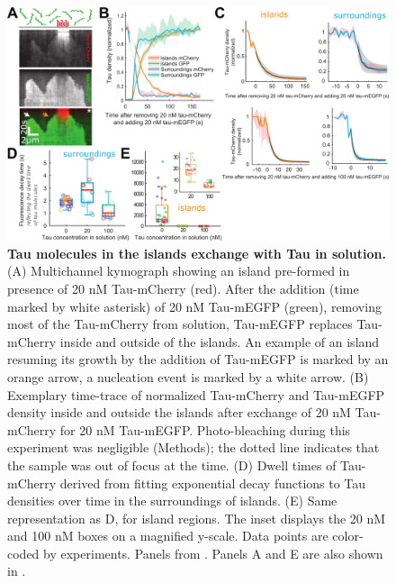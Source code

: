 \begin{figure}[h!]
	\centering
	\includegraphics[width=1\linewidth]{Figures/Tau_EXCHANGE.png}
	\caption[Tau molecules in the islands exchange with Tau in solution.]{
	\textbf{Tau molecules in the islands exchange with Tau in solution.} (A) Multichannel kymograph showing an island pre-formed in presence of 20 nM Tau-mCherry (red). After the addition (time marked by white asterisk) of 20 nM Tau-mEGFP (green), removing most of the Tau-mCherry from solution, Tau-mEGFP replaces Tau-mCherry inside and outside of the islands. An example of an island resuming its growth by the addition of Tau-mEGFP is marked by an orange arrow, a nucleation event is marked by a white arrow. (B) Exemplary time-trace of normalized Tau-mCherry and Tau-mEGFP density inside and outside the islands after exchange of 20 nM Tau-mCherry for 20 nM Tau-mEGFP. Photo-bleaching during this experiment was negligible (Methods); the dotted line indicates that the sample was out of focus at the time. (D) Dwell times of Tau-mCherry derived from fitting exponential decay functions to Tau densities over time in the surroundings of islands. (E) Same representation as D, for island regions. The inset displays the 20 nM and 100 nM boxes on a magnified y-scale. Data points are color-coded by experiments. Panels from \cite{Siahaan2019a}. Panels A and E are also shown in \cite{Siahaan}.
		}\label{Tauexchange}
\end{figure}

